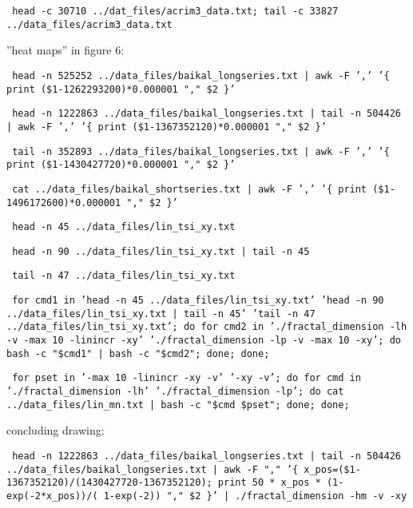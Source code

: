 \documentclass[a4paper]{article}
\begin{document}

\texttt{\small{ head -c 30710 ../dat\_files/acrim3\_data.txt; tail -c 33827 ../data\_files/acrim3\_data.txt } }

\noindent
''heat maps'' in figure 6:

\texttt{\small{ head -n 525252 ../data\_files/baikal\_longseries.txt |   awk -F ',' '\{ print (\$1-1262293200)*0.000001 "," \$2 \}' } }

\texttt{\small{ head -n 1222863 ../data\_files/baikal\_longseries.txt | tail -n 504426 |  awk -F ',' '\{ print (\$1-1367352120)*0.000001 "," \$2 \}' } }

\texttt{\small{ tail -n 352893 ../data\_files/baikal\_longseries.txt |  awk -F ',' '\{ print (\$1-1430427720)*0.000001 "," \$2 \}' } }

\texttt{\small{ cat ../data\_files/baikal\_shortseries.txt |  awk -F ',' '\{ print (\$1-1496172600)*0.000001 "," \$2 \}' } }

\texttt{\small{ head -n 45 ../data\_files/lin\_tsi\_xy.txt } }

\texttt{\small{ head -n 90 ../data\_files/lin\_tsi\_xy.txt | tail -n 45 } }

\texttt{\small{ tail -n 47 ../data\_files/lin\_tsi\_xy.txt } }

\texttt{\small{ for cmd1 in 'head -n 45 ../data\_files/lin\_tsi\_xy.txt' 'head -n 90 ../data\_files/lin\_tsi\_xy.txt | tail -n 45' 'tail -n 47 ../data\_files/lin\_tsi\_xy.txt'; do for cmd2 in './fractal\_dimension -lh -v -max 10 -linincr -xy' './fractal\_dimension -lp -v -max 10 -xy'; do bash -c "\$cmd1" | bash -c "\$cmd2"; done; done; } }

\texttt{\small{ for pset in '-max 10 -linincr -xy -v' '-xy -v'; do for cmd in './fractal\_dimension -lh' './fractal\_dimension -lp'; do cat ../data\_files/lin\_mn.txt | bash -c "\$cmd \$pset"; done; done;  } }

\vskip 12pt
\noindent
concluding drawing:

\texttt{\small{ head -n 1222863 ../data\_files/baikal\_longseries.txt | tail -n 504426 ../data\_files/baikal\_longseries.txt |  awk -F "," '\{ x\_pos=(\$1-1367352120)/(1430427720-1367352120); print 50 * x\_pos * (1-exp(-2*x\_pos))/( 1-exp(-2)) "," \$2 \}' | ./fractal\_dimension -hm -v -xy } }
\end{document}
